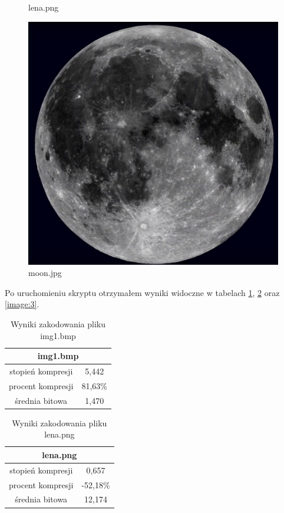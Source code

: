 \documentclass[12pt]{article}
\begin{document}
\begin{figure}[!htb]
    \caption{lena.png}
  \endminipage\hfill
    \includegraphics[width=\linewidth]{moon}
    \caption{moon.jpg}
  \endminipage
\end{figure}
Po uruchomieniu skryptu otrzymałem wyniki widoczne w tabelach \ref{image:1}, \ref{image:2} oraz \ref{image:3}.
\begin{table}[ht!]
  \centering
  \begin{tabular}{|c|c|}
    \hline
    \multicolumn{2}{|c|}{img1.bmp} \\
    \hline
    \hline
    stopień kompresji & 5,442\\
    procent kompresji & 81,63\%\\
    średnia bitowa & 1,470 \\
    \hline
  \end{tabular}
  \caption{Wyniki zakodowania pliku img1.bmp}
  \label{image:1}
\end{table}
\begin{table}[ht!]
  \centering
  \begin{tabular}{|c|c|}
    \hline
    \multicolumn{2}{|c|}{lena.png} \\
    \hline
    \hline
    stopień kompresji & 0,657\\
    procent kompresji & -52,18\%\\
    średnia bitowa & 12,174 \\
    \hline
  \end{tabular}
  \caption{Wyniki zakodowania pliku lena.png}
  \label{image:2}
\end{table}
\end{document}
